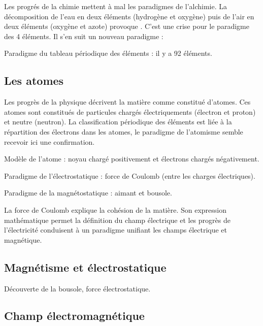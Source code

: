 Les progrés de la chimie mettent à mal les paradigmes de l'alchimie.
La décomposition de l'eau en deux éléments (hydrogène et oxygène) puis de l'air en deux éléments (oxygène et azote) provoque . C'est une crise pour le paradigme des 4 éléments. Il s'en suit un nouveau paradigme :

\begin{center}
Paradigme du tableau périodique des éléments : il y a 92 éléments.
\end{center}
\subsection{Les atomes}

Les progrès de la physique décrivent la matière comme constitué d'atomes. Ces atomes sont constitués de particules chargés électriquements (électron et proton) et neutre (neutron). La classification périodique des éléments est liée à la répartition des électrons dans les atomes, le paradigme de l'atomisme semble recevoir ici une confirmation.
\begin{center}
Modèle de l'atome : noyau chargé positivement et électrons chargés négativement.
\end{center}

\begin{center}
Paradigme de l'électrostatique : force de Coulomb (entre les charges électriques).

Paradigme de la magnétostatique : aimant et bousole.
\end{center}

La force de Coulomb explique la cohésion de la matière. Son expression mathématique permet la définition du champ électrique et les progrès de l'électricité conduisent à un paradigme unifiant les champs électrique et magnétique.

\subsection{Magnétisme et électrostatique}
Découverte de la bousole, force électrostatique. 
\subsection{Champ électromagnétique}

